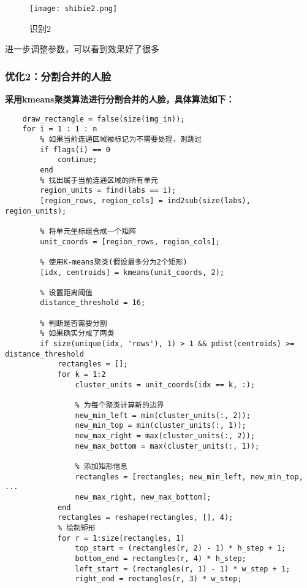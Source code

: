 \documentclass[12pt]{article}
\begin{document}
\begin{figure}[H]
    \centering
    \texttt{[image: shibie2.png]}
    \caption{识别2}
\end{figure}

进一步调整参数，可以看到效果好了很多

\subsubsection{优化2：分割合并的人脸}
\textbf{采用kmeans聚类算法进行分割合并的人脸，具体算法如下：}
\begin{lstlisting}
    draw_rectangle = false(size(img_in));
    for i = 1 : 1 : n
        % 如果当前连通区域被标记为不需要处理，则跳过
        if flags(i) == 0
            continue;
        end
        % 找出属于当前连通区域的所有单元
        region_units = find(labs == i);
        [region_rows, region_cols] = ind2sub(size(labs), region_units);

        % 将单元坐标组合成一个矩阵
        unit_coords = [region_rows, region_cols];
        
        % 使用K-means聚类(假设最多分为2个矩形)
        [idx, centroids] = kmeans(unit_coords, 2);

        % 设置距离阈值
        distance_threshold = 16;
        
        % 判断是否需要分割
        % 如果确实分成了两类
        if size(unique(idx, 'rows'), 1) > 1 && pdist(centroids) >= distance_threshold
            rectangles = [];
            for k = 1:2
                cluster_units = unit_coords(idx == k, :);
                
                % 为每个聚类计算新的边界
                new_min_left = min(cluster_units(:, 2));
                new_min_top = min(cluster_units(:, 1));
                new_max_right = max(cluster_units(:, 2));
                new_max_bottom = max(cluster_units(:, 1));
                
                % 添加矩形信息
                rectangles = [rectangles; new_min_left, new_min_top, ...
                new_max_right, new_max_bottom];
            end
            rectangles = reshape(rectangles, [], 4);
            % 绘制矩形
            for r = 1:size(rectangles, 1)
                top_start = (rectangles(r, 2) - 1) * h_step + 1;
                bottom_end = rectangles(r, 4) * h_step;
                left_start = (rectangles(r, 1) - 1) * w_step + 1;
                right_end = rectangles(r, 3) * w_step;
                

\end{lstlisting}
\end{document}
